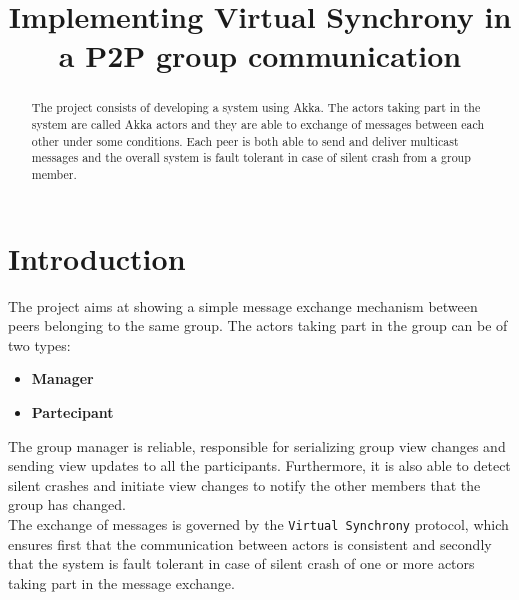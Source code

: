 \documentclass[conference]{IEEEtran}
\begin{document}
\title{Implementing Virtual Synchrony in a P2P group communication}

\author{
}

\maketitle

\begin{abstract}
The project consists of developing a system using Akka. The actors
taking part in the system are called Akka actors and they are able
to exchange of messages between each other under some conditions.
Each peer is both able to send and deliver multicast messages and 
the overall system is fault tolerant in case of silent crash from
a group member.   

\end{abstract}

\section{Introduction}
\label{sec:introduction}
The project aims at showing a simple message exchange mechanism between
peers belonging to the same group. The actors taking part in the group
can be of two types:
\begin{itemize}
	\item \textbf{Manager}
	\item \textbf{Partecipant}
\end{itemize} 
The group manager is reliable, responsible for serializing group view
changes and sending view updates to all the participants. 
Furthermore, it is also able to detect silent crashes and initiate view
changes to notify the other members that the group has changed.\\
The exchange of messages is governed by the \texttt{Virtual Synchrony}
protocol, which ensures first that the communication between actors is
consistent and secondly that the system is fault tolerant in case of
silent crash of one or more actors taking part in the message exchange.
\end{document}
